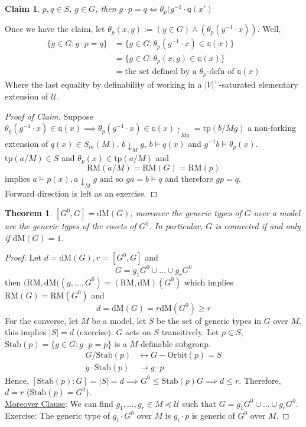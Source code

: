 \documentclass[letterpaper, 12pt]{article}
\newcommand{\cU}{\mathcal{U}}
\newcommand{\bq}{\mathbb{q}}
\newcommand{\tp}{\mbox{tp}}
\newcommand{\Stab}{\mbox{Stab}}
\newcommand{\RM}{\mbox{RM}}
\newcommand{\dM}{\mbox{dM}}
\newcommand{\da}{\downarrow}
\newcommand{\uhr}{\upharpoonright}
\theoremstyle{stdthm}
\newtheorem{thm}{Theorem}[section]
\theoremstyle{stddef}
\theoremstyle{stdnonum}
\newtheorem{claim}{Claim}
\theoremstyle{stdqands}
\theoremstyle{stdbold}
\begin{document}
\begin{claim}
$p,q \in S$, $g\in G$, then $g\cdot p = q \iff \theta_p(g^{-1}\cdot \bq(x')$ 
\end{claim}

\noindent Once we have the claim, let $\theta_p(x,y) := (y \in G) \wedge (\theta_p(y^{-1} \cdot x))$. Well, 
\begin{align*}
\{g \in G: g \cdot p = q\} &= \{g \in G: \theta_p(g^{-1}\cdot x) \in \bq(x) \}\\
&= \{g \in G: \theta_p(x,g) \in \bq(x)\} \\
&= \mbox{the set defined by a $\theta_p$-defn of $\bq(x)$}
\end{align*}
Where the last equality by definability of working in a $|V|^+$-saturated elementary extension of $\cU$. 

\begin{proof}[Proof of Claim]
Suppose $\theta_p(g^{-1}\cdot x) \in \bq(x) \implies \theta_p(g^{-1} \cdot x) \in \bq(x) \uhr_{Mg} = \tp(b/Mg)$ a non-forking extension  of $q(x) \in S_m(M)$. $b \da_M g$, $b \models q(x)$ and $g^{-1}b \models \theta_p(x)$. $\tp(a/M) \in S$ and $\theta_p(x) \in \tp(a/M)$ and 
\[ \RM(a/M) = \RM(G) = \RM(p) \]
implies $a \models p(x), a \da_M g$ and so $ga = b \models q$ and therefore $gp = q$. \\

Forward direction is left as an exercise. 

\end{proof}


\begin{thm}
$[G^0,G] = \dM(G)$, moreover the generic types of $G$ over a model are the generic types of the cosets of $G^0$. In particular, $G$ is connected if and only if $\dM(G) = 1$. 
\end{thm}

\begin{proof}
Let $d = \dM(G), r = [G^0,G]$ and 
\[ G = g_1G^0 \cup \dots \cup g_rG^0 \]
then $(\RM,\dM((g,\dots,G^0) = (\RM,\dM) (G^0)$ which implies $\RM(G) = \RM(G^0)$ and 
\[ d = \dM(G) = r\dM(G^0) \geq r \]
For the converse, let $M$ be a model, let $S$ be the set of generic types in $G$ over $M$, this implies $|S|=d$ (exercise). $G$ acts on $S$ transitively. Let $p \in S$, $\mbox{Stab}(p) = \{g \in G: g\cdot p = p \}$ is a $M$-definable subgroup. 
\begin{align*}
G/\Stab(p) &\leftrightarrow G-\mbox{Orbit}(p) = S \\
g\cdot \Stab(p) &\to g \cdot p
\end{align*}
Hence, $[\Stab(p):G] = |S| = d \implies G^0 \leq \Stab(p) G \implies d \leq r$. Therefore, $d = r$ ($\Stab(p)= G^0$). \\

\noindent \underline{Moreover Clause}: We can find $g_1,\dots, g_r \in M \preceq \cU$ such that $G = g_1G^0 \cup \dots \cup g_r G^0$. Exercise: The generic type of $g_i\cdot G^0$ over $M$ is $g_i \cdot p$ is generic of $G^0$ over $M$. 

\end{proof}
\end{document}
